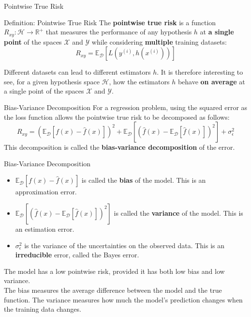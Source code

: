 \begin{frame}{Pointwise True Risk}
	\begin{block}{Definition: Pointwise True Risk}
		The \textbf{pointwise true risk} is a function $R_{xy}: \mathcal{H} \to \mathbb{R}^+$ that measures the performance of any hypothesis $h$ at \textbf{a single point} of the spaces $\mathcal{X}$ and $\mathcal{Y}$ while considering \textbf{multiple} training datasets:
		\begin{equation*}
			R_{xy} = \mathbb{E}_{\mathcal{D}}\left[L\left(y^{(i)}, h\left(x^{(i)}\right)\right)\right]
		\end{equation*}
			\hfill
	\end{block}
	\vspace{0.5cm}
	\pause
	Different datasets can lead to different estimators $h$. It is therefore interesting to see, for a given hypothesis space $\mathcal{H}$, how the estimators $h$ behave \textbf{on average} at a single point of the spaces $\mathcal{X}$ and $\mathcal{Y}$.
\end{frame}
		
\begin{frame}{Bias-Variance Decomposition}
	For a regression problem, using the squared error as the loss function allows the pointwise true risk to be decomposed as follows:
	\begin{equation*}
		R_{xy} = \left(\mathbb{E}_{\mathcal{D}}\left[f(x) - \hat{f}(x)\right]\right)^2 + \mathbb{E}_{\mathcal{D}}\left[\left(\hat{f}(x) - \mathbb{E}_{\mathcal{D}}\left[\hat{f}(x)\right]\right)^2\right] + \sigma_{\epsilon}^2
	\end{equation*}
	This decomposition is called the \textbf{bias-variance decomposition} of the error.
\end{frame}
			
\begin{frame}{Bias-Variance Decomposition}
	\begin{itemize}
		\item $\mathbb{E}_{\mathcal{D}}\left[f(x) - \hat{f}(x)\right]$ is called the \textbf{bias} of the model. This is an approximation error.
		\item $\mathbb{E}_{\mathcal{D}}\left[\left(\hat{f}(x) - \mathbb{E}_{\mathcal{D}}\left[\hat{f}(x)\right]\right)^2\right]$ is called the \textbf{variance} of the model. This is an estimation error.
		\item $\sigma_{\epsilon}^2$ is the variance of the uncertainties on the observed data. This is an \textbf{irreducible} error, called the Bayes error.
	\end{itemize}
	
	\pause
	\vspace{0.5cm}
	
	The model has a low pointwise risk, provided it has both low bias and low variance. \\
	The bias measures the average difference between the model and the true function. The variance measures how much the model's prediction changes when the training data changes.
\end{frame}
			
